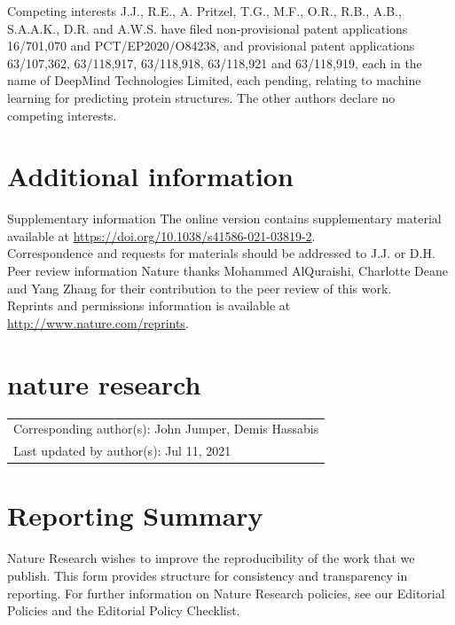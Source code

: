 \documentclass[10pt]{article}
\begin{document}
Competing interests J.J., R.E., A. Pritzel, T.G., M.F., O.R., R.B., A.B., S.A.A.K., D.R. and A.W.S. have filed non-provisional patent applications 16/701,070 and PCT/EP2020/O84238, and provisional patent applications 63/107,362, 63/118,917, 63/118,918, 63/118,921 and 63/118,919, each in the name of DeepMind Technologies Limited, each pending, relating to machine learning for predicting protein structures. The other authors declare no competing interests.

\section*{Additional information}
Supplementary information The online version contains supplementary material available at \href{https://doi.org/10.1038/s41586-021-03819-2}{https://doi.org/10.1038/s41586-021-03819-2}.\\
Correspondence and requests for materials should be addressed to J.J. or D.H.\\
Peer review information Nature thanks Mohammed AlQuraishi, Charlotte Deane and Yang Zhang for their contribution to the peer review of this work.\\
Reprints and permissions information is available at \href{http://www.nature.com/reprints}{http://www.nature.com/reprints}.

\section*{nature research}
\begin{center}
\begin{tabular}{l}
Corresponding author(s): John Jumper, Demis Hassabis \\
Last updated by author(s): Jul 11, 2021 \\
\hline
\end{tabular}
\end{center}

\section*{Reporting Summary}
Nature Research wishes to improve the reproducibility of the work that we publish. This form provides structure for consistency and transparency in reporting. For further information on Nature Research policies, see our Editorial Policies and the Editorial Policy Checklist.
\end{document}
